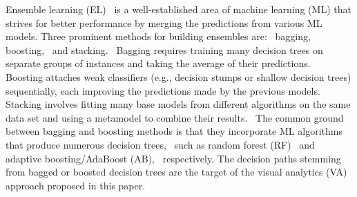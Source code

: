 Ensemble learning (EL)~\cite{Zhou2009Ensemble} is a well-established area of machine learning (ML) that strives for better performance by merging the predictions from various ML models.
Three prominent methods for building ensembles are:~\cite{Sagi2018Ensemble}
%
bagging,~\cite{Breiman1996Stacked} boosting,~\cite{Freund1996Experiments,Schapire1990Strength} and stacking.~\cite{Wolpert1992Stacked} 
Bagging requires training many decision trees on separate groups of instances and taking the average of their predictions.~\cite{Breiman1996Stacked}
Boosting attaches weak classifiers (e.g., decision stumps or shallow decision trees) sequentially, each improving the predictions made by the previous models.~\cite{Freund1996Experiments,Schapire1990Strength} 
Stacking involves fitting many base models from different algorithms on the same data set and using a metamodel to combine their results.~\cite{Wolpert1992Stacked} The common ground between bagging and boosting methods is that they incorporate ML algorithms that produce numerous decision trees,~\cite{Kingsford2008Decision} such as random forest (RF)~\cite{Breiman2001Random} and adaptive boosting/AdaBoost (AB),~\cite{Freund1999A} respectively. The decision paths stemming from bagged or boosted decision trees are the target of the visual analytics (VA) approach proposed in this paper.

